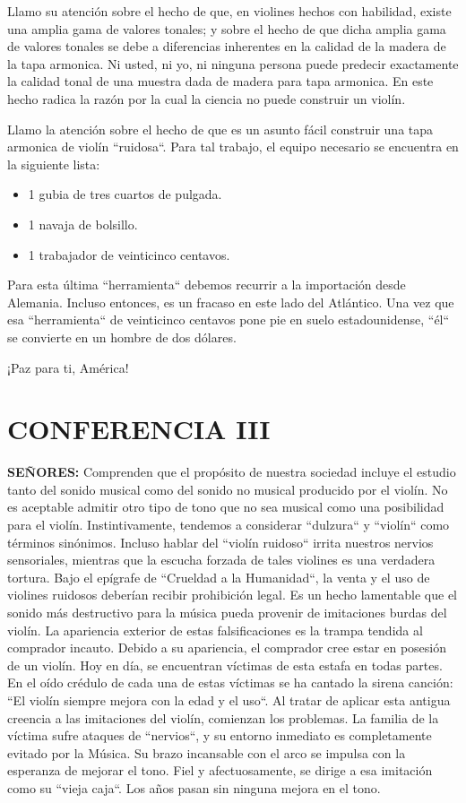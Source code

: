\documentclass[12pt]{book}
\begin{document}
Llamo su atención sobre el hecho de que, en violines hechos con habilidad, existe una amplia gama de valores tonales; y sobre el hecho de que dicha amplia gama de valores tonales se debe a diferencias inherentes en la calidad de la madera de la tapa armonica. Ni usted, ni yo, ni ninguna persona puede predecir exactamente la calidad tonal de una muestra dada de madera para tapa armonica. En este hecho radica la razón por la cual la ciencia no puede construir un violín.

Llamo la atención sobre el hecho de que es un asunto fácil construir una tapa armonica de violín ``ruidosa``. Para tal trabajo, el equipo necesario se encuentra en la siguiente lista:

\begin{itemize}
    \item 1 gubia de tres cuartos de pulgada.
    \item 1 navaja de bolsillo.
    \item 1 trabajador de veinticinco centavos.
\end{itemize}

Para esta última ``herramienta`` debemos recurrir a la importación desde Alemania. Incluso entonces, es un fracaso en este lado del Atlántico. Una vez que esa ``herramienta`` de veinticinco centavos pone pie en suelo estadounidense, ``él`` se convierte en un hombre de dos dólares.

¡Paz para ti, América!

\chapter*{CONFERENCIA III}

\textbf{SEÑORES:} Comprenden que el propósito de nuestra sociedad incluye el estudio tanto del sonido musical como del sonido no musical producido por el violín. No es aceptable admitir otro tipo de tono que no sea musical como una posibilidad para el violín. Instintivamente, tendemos a considerar ``dulzura`` y ``violín`` como términos sinónimos. Incluso hablar del ``violín ruidoso`` irrita nuestros nervios sensoriales, mientras que la escucha forzada de tales violines es una verdadera tortura. Bajo el epígrafe de ``Crueldad a la Humanidad``, la venta y el uso de violines ruidosos deberían recibir prohibición legal. Es un hecho lamentable que el sonido más destructivo para la música pueda provenir de imitaciones burdas del violín. La apariencia exterior de estas falsificaciones es la trampa tendida al comprador incauto. Debido a su apariencia, el comprador cree estar en posesión de un violín. Hoy en día, se encuentran víctimas de esta estafa en todas partes. En el oído crédulo de cada una de estas víctimas se ha cantado la sirena canción: ``El violín siempre mejora con la edad y el uso``. Al tratar de aplicar esta antigua creencia a las imitaciones del violín, comienzan los problemas. La familia de la víctima sufre ataques de ``nervios``, y su entorno inmediato es completamente evitado por la Música. Su brazo incansable con el arco se impulsa con la esperanza de mejorar el tono. Fiel y afectuosamente, se dirige a esa imitación como su ``vieja caja``. Los años pasan sin ninguna mejora en el tono.
\end{document}
